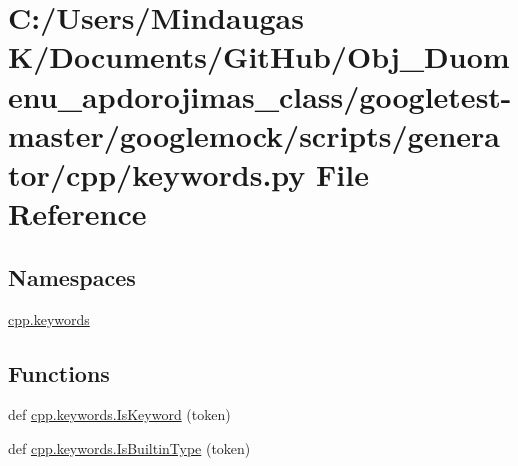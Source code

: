\hypertarget{googletest-master_2googlemock_2scripts_2generator_2cpp_2keywords_8py}{}\section{C\+:/\+Users/\+Mindaugas K/\+Documents/\+Git\+Hub/\+Obj\+\_\+\+Duomenu\+\_\+apdorojimas\+\_\+class/googletest-\/master/googlemock/scripts/generator/cpp/keywords.py File Reference}
\label{googletest-master_2googlemock_2scripts_2generator_2cpp_2keywords_8py}
\subsection*{Namespaces}
\begin{DoxyCompactItemize}
\item 
 \mbox{\hyperlink{namespacecpp_1_1keywords}{cpp.\+keywords}}
\end{DoxyCompactItemize}
\subsection*{Functions}
\begin{DoxyCompactItemize}
\item 
def \mbox{\hyperlink{namespacecpp_1_1keywords_ab9edc2cbd4a9d5ad58a1c0ad3281cbc9}{cpp.\+keywords.\+Is\+Keyword}} (token)
\item 
def \mbox{\hyperlink{namespacecpp_1_1keywords_ae0f7a581fef26ad1a71c59bd963ee285}{cpp.\+keywords.\+Is\+Builtin\+Type}} (token)
\end{DoxyCompactItemize}
